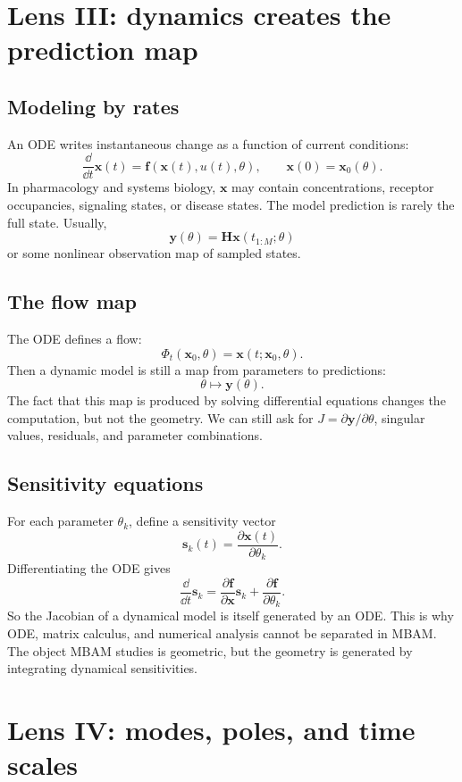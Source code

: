 \documentclass[a4paper]{article}
\newcommand{\ddt}{\frac{\dd}{\dd t}}
\newcommand{\pd}[2]{\frac{\partial #1}{\partial #2}}
\newcommand{\mat}[1]{\mathbf{#1}}
\newcommand{\vect}[1]{\mathbf{#1}}
\newcommand{\param}{\theta}
\newcommand{\jac}{J}
\begin{document}
\section{Lens III: dynamics creates the prediction map}

\subsection{Modeling by rates}

An ODE writes instantaneous change as a function of current conditions:
\[
  \ddt \vect{x}(t)
  =
  \vect{f}(\vect{x}(t),u(t),\param),
  \qquad
  \vect{x}(0)=\vect{x}_0(\param).
\]
In pharmacology and systems biology, \(\vect{x}\) may contain concentrations, receptor occupancies, signaling states, or disease states.  The model prediction is rarely the full state.  Usually,
\[
  \vect{y}(\param)
  =
  \mat{H}\vect{x}(t_{1:M};\param)
\]
or some nonlinear observation map of sampled states.

\subsection{The flow map}

The ODE defines a flow:
\[
  \Phi_t(\vect{x}_0,\param)=\vect{x}(t;\vect{x}_0,\param).
\]
Then a dynamic model is still a map from parameters to predictions:
\[
  \param
  \longmapsto
  \vect{y}(\param).
\]
The fact that this map is produced by solving differential equations changes the computation, but not the geometry.  We can still ask for \(\jac=\partial\vect{y}/\partial\param\), singular values, residuals, and parameter combinations.

\subsection{Sensitivity equations}

For each parameter \(\theta_k\), define a sensitivity vector
\[
  \vect{s}_k(t)=\pd{\vect{x}(t)}{\theta_k}.
\]
Differentiating the ODE gives
\[
  \ddt \vect{s}_k
  =
  \pd{\vect{f}}{\vect{x}}\vect{s}_k
  +
  \pd{\vect{f}}{\theta_k}.
\]
So the Jacobian of a dynamical model is itself generated by an ODE.  This is why ODE, matrix calculus, and numerical analysis cannot be separated in MBAM.  The object MBAM studies is geometric, but the geometry is generated by integrating dynamical sensitivities.

\section{Lens IV: modes, poles, and time scales}
\end{document}
